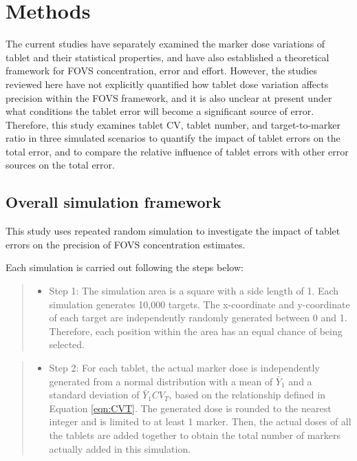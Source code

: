\documentclass[
  12pt,
]{article}
\providecommand{\tightlist}{%
  \setlength{\itemsep}{0pt}\setlength{\parskip}{0pt}}
\begin{document}
\section{Methods}\label{methods}

The current studies have separately examined the marker dose variations
of tablet and their statistical properties, and have also established a
theoretical framework for FOVS concentration, error and effort. However,
the studies reviewed here have not explicitly quantified how tablet dose
variation affects precision within the FOVS framework, and it is also
unclear at present under what conditions the tablet error will become a
significant source of error. Therefore, this study examines tablet CV,
tablet number, and target-to-marker ratio in three simulated scenarios
to quantify the impact of tablet errors on the total error, and to
compare the relative influence of tablet errors with other error sources
on the total error.

\subsection{Overall simulation
framework}\label{overall-simulation-framework}

This study uses repeated random simulation to investigate the impact of
tablet errors on the precision of FOVS concentration estimates.

Each simulation is carried out following the steps below:

\begin{quote}
\begin{itemize}
\tightlist
\item
  Step 1: The simulation area is a square with a side length of 1. Each
  simulation generates 10,000 targets. The x-coordinate and y-coordinate
  of each target are independently randomly generated between 0 and 1.
  Therefore, each position within the area has an equal chance of being
  selected.
\end{itemize}
\end{quote}

\begin{quote}
\begin{itemize}
\tightlist
\item
  Step 2: For each tablet, the actual marker dose is independently
  generated from a normal distribution with a mean of \(\bar{Y}_1\) and
  a standard deviation of \(\bar{Y}_1CV_T\), based on the relationship
  defined in Equation \eqref{eqn:CVT}. The generated dose is rounded to
  the nearest integer and is limited to at least 1 marker. Then, the
  actual doses of all the tablets are added together to obtain the total
  number of markers actually added in this simulation.
\end{itemize}
\end{quote}
\end{document}
